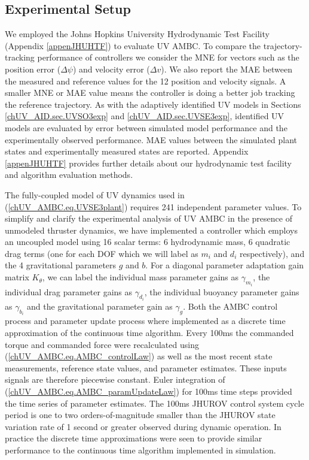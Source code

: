 
\subsection{Experimental Setup}
\label{chUV_AMBC.sec.expSetup}


We employed the Johns Hopkins University Hydrodynamic Test Facility
(Appendix \ref{appenJHUHTF}) to evaluate \ac{UV} \ac{AMBC}.
%
To compare the trajectory-tracking performance of controllers we
consider the \ac{MNE} for vectors such as the position error ($\Delta
\psi$) and velocity error ($\Delta v$).
%
We also report the \ac{MAE} between the measured and reference
values for the 12 position and velocity signals.
%
A smaller \ac{MNE} or \ac{MAE} value means the controller is doing a
better job tracking the reference trajectory.
%
As with the adaptively identified \ac{UV} models in Sections
\ref{chUV_AID.sec.UVSO3exp} and \ref{chUV_AID.sec.UVSE3exp},
identified \ac{UV} models are evaluated by error between simulated
model performance and the experimentally observed performance.
%
\ac{MAE} values between the simulated plant states and
experimentally measured states are reported.
%
Appendix \ref{appenJHUHTF} provides further details about
our hydrodynamic test facility and algorithm evaluation methods.


The fully-coupled model of \ac{UV} dynamics used in
(\ref{chUV_AMBC.eq.UVSE3plant}) requires 241 independent parameter
values.
%
To simplify and clarify the experimental analysis of \ac{UV} \ac{AMBC}
in the presence of unmodeled thruster dynamics, we have implemented a
controller which employs an uncoupled model using 16 scalar terms: 6
hydrodynamic mass, 6 quadratic drag terms (one for each \ac{DOF} which
we will label as $m_i$ and $d_i$ respectively), and the 4
gravitational parameters $g$ and $b$.
%
For a diagonal parameter adaptation gain matrix $K_\theta$, we can
label the individual mass parameter gains as $\gamma_{m_i}$, the
individual drag parameter gains as $\gamma_{d_i}$, the individual
buoyancy parameter gains as $\gamma_{b_i}$ and the gravitational
parameter gain as $\gamma_{g}$.
%
Both the \ac{AMBC} control process and parameter update process
where implemented as a discrete time approximation of the
continuous time algorithm.
%
Every 100ms the commanded torque and commanded force were recalculated
using (\ref{chUV_AMBC.eq.AMBC_controlLaw}) as well as the most recent
state measurements, reference state values, and parameter estimates.
%
These inputs signals are therefore piecewise constant.
%
Euler integration of (\ref{chUV_AMBC.eq.AMBC_paramUpdateLaw}) for
100ms time steps provided the time series of parameter estimates.
%
The 100ms \ac{JHUROV} control system cycle period is one to two
orders-of-magnitude smaller than the \ac{JHUROV} state variation rate
of 1 second or greater observed during dynamic operation.
%
In practice the discrete time approximations were seen to provide
similar performance to the continuous time algorithm implemented in
simulation.


